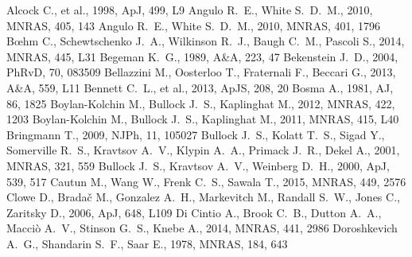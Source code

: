 \documentclass[paper=a4, fontsize=11pt]{scrartcl} %
\numberwithin{equation}{section} %
\numberwithin{figure}{section} %
\numberwithin{table}{section} %
\begin{document}
\newpage
\begin{thebibliography}{}
Alcock C., et al., 1998, ApJ, 499, L9 
 Angulo R.~E., White S.~D.~M., 2010, MNRAS, 405, 143 
 Angulo R.~E., White S.~D.~M., 2010, MNRAS, 401, 1796 
 B{\oe}hm C., Schewtschenko J.~A., 
Wilkinson R.~J., Baugh C.~M., Pascoli S., 2014, MNRAS, 445, L31 
 Begeman K.~G., 1989, A\&A, 223, 47 
Bekenstein J.~D., 2004, PhRvD, 70, 083509 
 Bellazzini M., Oosterloo T., Fraternali F., Beccari G., 2013, A\&A, 559, L11 
 Bennett C.~L., et al., 2013, ApJS, 208, 20 
 Bosma 
A., 1981, AJ, 86, 1825 
 Boylan-Kolchin M., Bullock J.~S., Kaplinghat M., 2012, MNRAS, 422, 1203 
 Boylan-Kolchin M., Bullock J.~S., Kaplinghat M., 2011, MNRAS, 415, L40 
Bringmann T., 2009, NJPh, 11, 105027 
 Bullock J.~S., Kolatt T.~S., Sigad Y., 
Somerville R.~S., Kravtsov A.~V., Klypin A.~A., Primack J.~R., Dekel A., 
2001, MNRAS, 321, 559 
 Bullock J.~S., Kravtsov A.~V., Weinberg D.~H., 2000, ApJ, 539, 517 
Cautun M., Wang W., Frenk C.~S., Sawala T., 2015, MNRAS, 449, 2576 
Clowe D., Brada{\v c} M., Gonzalez A.~H., Markevitch M., Randall S.~W., 
Jones C., Zaritsky D., 2006, ApJ, 648, L109 
 Di Cintio A., Brook C.~B., Dutton A.~A., 
Macci{\`o} A.~V., Stinson G.~S., Knebe A., 2014, MNRAS, 441, 2986 
 Doroshkevich A.~G., Shandarin S.~F., Saar E., 1978, MNRAS, 184, 643 

\end{thebibliography}
\end{document}
